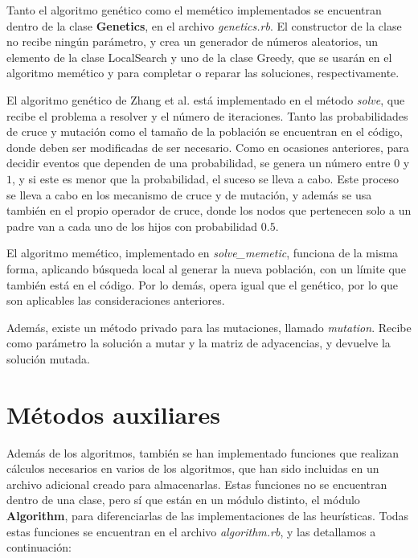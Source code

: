 Tanto el algoritmo genético como el memético implementados se encuentran dentro de
la clase \textbf{Genetics}, en el archivo \textit{genetics.rb}. El constructor
de la clase no recibe ningún parámetro, y crea un generador de números aleatorios,
un elemento de la clase LocalSearch y uno de la clase Greedy, que se usarán en el
algoritmo memético y para completar o reparar las soluciones, respectivamente.

El algoritmo genético de Zhang et al. está implementado en el método \textit{solve},
que recibe el problema a resolver y el número de iteraciones. Tanto las probabilidades
de cruce y mutación como el tamaño de la población se encuentran en el código, donde
deben ser modificadas de ser necesario. Como en ocasiones anteriores, para decidir
eventos que dependen de una probabilidad, se genera un número entre $0$ y $1$, y si
este es menor que la probabilidad, el suceso se lleva a cabo. Este proceso se lleva
a cabo en los mecanismo de cruce y de mutación, y además se usa también en el propio
operador de cruce, donde los nodos que pertenecen solo a un padre van a cada uno de
los hijos con probabilidad $0.5$.

El algoritmo memético, implementado en \textit{solve\_memetic}, funciona de la misma
forma, aplicando búsqueda local al generar la nueva población, con un límite que
también está en el código. Por lo demás, opera  igual que el genético, por lo que
son aplicables las consideraciones anteriores.

Además, existe un método privado para las mutaciones, llamado \textit{mutation}.
Recibe como parámetro la solución a mutar y la matriz de adyacencias, y devuelve
la solución mutada.


\section{Métodos auxiliares}

Además de los algoritmos, también se han implementado funciones que realizan
cálculos necesarios en varios de los algoritmos, que han sido incluidas en un
archivo adicional creado para almacenarlas. Estas funciones no se encuentran
dentro de una clase, pero sí que están en un módulo distinto, el módulo \textbf{Algorithm},
para diferenciarlas de las implementaciones de las heurísticas. Todas estas funciones
se encuentran en el archivo \textit{algorithm.rb}, y las detallamos a continuación:

